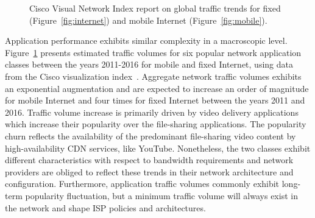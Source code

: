 \begin{figure}[] 
  \caption[Cisco Visual Network Index report on global traffic trends]{Cisco
    Visual Network Index report on global traffic trends
    for fixed (Figure~\ref{fig:internet}) and mobile Internet (Figure~\ref{fig:mobile}).}
  \label{fig:internet_applications} 
\end{figure}

Application performance exhibits similar complexity in a macroscopic level.
Figure~\ref{fig:internet_applications} presents estimated traffic volumes for
six popular network application classes between the years 2011-2016 for mobile
and fixed Internet, using data from the Cisco visualization
index~. Aggregate network traffic volumes
exhibits an exponential augmentation and are expected to increase an order of
magnitude for mobile Internet and four times for fixed Internet between the
years 2011 and 2016. Traffic volume increase is primarily driven by video
delivery applications which increase their popularity over the file-sharing
applications. The popularity churn reflects the availability of the predominant
file-sharing video content by high-availability CDN services, like YouTube.
Nonetheless, the two classes exhibit different characteristics with respect to
bandwidth requirements and network providers are obliged to reflect these
trends in their network architecture and configuration. Furthermore,
application traffic volumes commonly exhibit long-term popularity fluctuation,
but a minimum traffic volume will always exist in the network and shape ISP
policies and architectures. 


